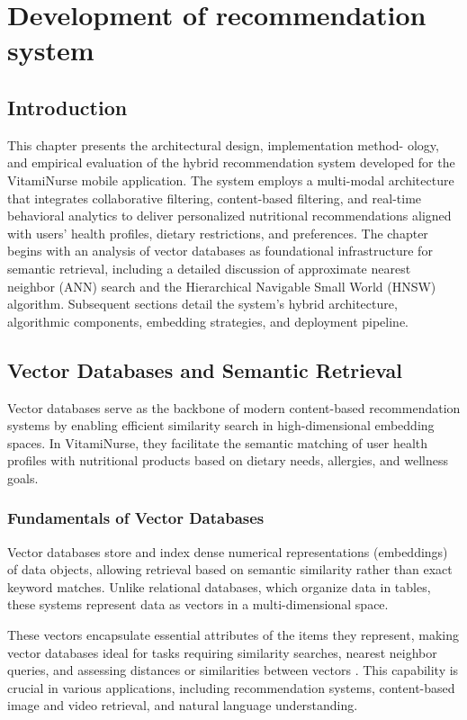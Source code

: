 \chapter{Development of recommendation system}
\section*{Introduction}
This chapter presents the architectural design, implementation method-
ology, and empirical evaluation of the hybrid recommendation system
developed for the VitamiNurse mobile application. The system employs
a multi-modal architecture that integrates collaborative filtering, content-based filtering, and real-time behavioral analytics to deliver personalized
nutritional recommendations aligned with users’ health profiles, dietary
restrictions, and preferences.
The chapter begins with an analysis of vector databases as foundational
infrastructure for semantic retrieval, including a detailed discussion of approximate nearest neighbor (ANN) search and the Hierarchical Navigable
Small World (HNSW) algorithm. Subsequent sections detail the system’s
hybrid architecture, algorithmic components, embedding strategies, and
deployment pipeline.


\section{Vector Databases and Semantic Retrieval}
Vector databases serve as the backbone of modern content-based recommendation systems by enabling efficient similarity search in high-dimensional embedding spaces. In VitamiNurse, they facilitate the semantic matching of user health profiles with nutritional products based on dietary needs, allergies, and wellness goals.

\subsection{Fundamentals of Vector Databases}
Vector databases store and index dense numerical representations (embeddings) of data objects, allowing retrieval based on semantic similarity rather than exact keyword matches. 
Unlike relational databases, which organize data in tables, these systems represent data as vectors in a multi-dimensional space. 

\par These vectors encapsulate essential attributes of the items they represent, 
making vector databases ideal for tasks requiring similarity searches, nearest neighbor queries, and assessing distances or similarities between vectors \cite{IBMVectordb2025}. 
This capability is crucial in various applications, including recommendation systems, content-based image and video retrieval, and natural language understanding.

